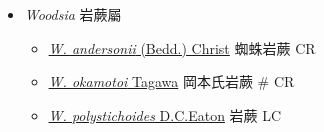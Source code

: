 
  \begin{itemize}
 \item[    ] \textit{Woodsia} 岩蕨屬
                                
  \begin{itemize}
        \item[] \href{http://www.theplantlist.org/tpl1.1/search?q=Woodsia+andersonii}{\textit{W. andersonii} (Bedd.) Christ}   蜘蛛岩蕨   CR
        \item[] \href{http://www.theplantlist.org/tpl1.1/search?q=Woodsia+okamotoi}{\textit{W. okamotoi} Tagawa}   岡本氏岩蕨  \# CR
        \item[] \href{http://www.theplantlist.org/tpl1.1/search?q=Woodsia+polystichoides}{\textit{W. polystichoides} D.C.Eaton}   岩蕨   LC
  \end{itemize}
  \end{itemize}
